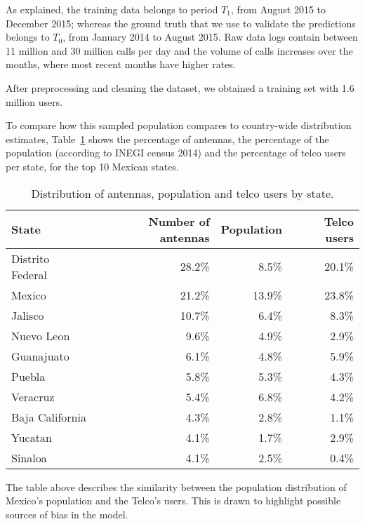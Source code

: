 As explained, the training data belongs to period $T_1$, from August 2015 to December 2015;
whereas the ground truth that we use to validate the predictions belongs to $T_0$, from January 2014 to August 2015. Raw data logs contain between 11 million and 30 million calls per day and the volume of calls increases over the months, where most recent months have higher rates.

After preprocessing and cleaning the dataset, we obtained 
a training set with 1.6 million users.

To compare how this sampled population compares to country-wide distribution estimates,
Table~\ref{tab:distribution_by_state} shows the percentage of antennas, the percentage of the population (according to INEGI census 2014) and
the percentage of telco users per state, for the top 10 Mexican states.


\begin{table}[ht]
	\caption{Distribution of antennas, population and telco users by state.}
	\label{tab:distribution_by_state}
	\centering
	\begin{tabular}{l r r r}
		\toprule
		State				& Number of antennas & Population 	& Telco users \\
		\midrule
		Distrito Federal      & 28.2\% 	& 8.5\%		& 20.1\%   \\
		Mexico                     & 21.2\%		&   13.9\% 	& 23.8\%   \\
		Jalisco                   & 10.7\% 	& 6.4\%		& 8.3\%    \\
		Nuevo Leon               & 9.6\%	& 4.9\%		& 2.9\% \\
		Guanajuato               & 6.1\%	& 4.8\%		& 5.9\% \\
		Puebla                     & 5.8\%	& 5.3\%		& 4.3\% \\
		Veracruz                  & 5.4\% 	& 6.8\%		& 4.2\% \\
		Baja California       & 4.3\%	& 2.8\%		& 1.1\% \\
		Yucatan                   & 4.1\%	& 1.7\%		& 2.9\% \\
		Sinaloa                   & 4.1\%	& 2.5\%		& 0.4\% \\
		\bottomrule
	\end{tabular}
\end{table}

The table above describes the similarity between the population distribution of Mexico's population and the Telco's users. This is drawn to highlight possible sources of bias in the model.

